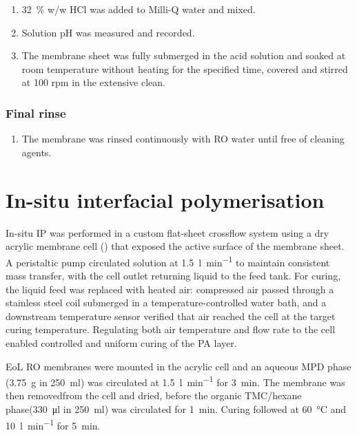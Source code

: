 \begin{enumerate}[resume]

\item \qty{32}{\percent} w/w HCl was added to Milli-Q water and mixed.

\item Solution pH was measured and recorded.

\item The membrane sheet was fully submerged in the acid solution and soaked at room temperature without heating for the specified time, covered and stirred at 100 rpm in the extensive clean.

\end{enumerate}

\subsubsection*{Final rinse}

\begin{enumerate}[resume]

\item The membrane was rinsed continuously with RO water until free of cleaning agents.

\end{enumerate}


\section{In-situ interfacial polymerisation}
\label{sec:ip-method}

In-situ IP was performed in a custom flat-sheet crossflow system using a dry acrylic membrane cell () that exposed the active surface of the membrane sheet. A peristaltic pump circulated solution at \qty{1.5}{\litre\per\minute} to maintain consistent mass transfer, with the cell outlet returning liquid to the feed tank. For curing, the liquid feed was replaced with heated air: compressed air passed through a stainless steel coil submerged in a temperature-controlled water bath, and a downstream temperature sensor verified that air reached the cell at the target curing temperature. Regulating both air temperature and flow rate to the cell enabled controlled and uniform curing of the PA layer.

EoL RO membranes were mounted in the acrylic cell and an aqueous MPD phase (\qty{3.75}{\gram} in \qty{250}{\milli\litre}) was circulated at \qty{1.5}{\litre\per\minute} for \qty{3}{\minute}. The membrane was then removedfrom the cell and dried, before the organic TMC/hexane phase(\qty{330}{\micro\litre} in \qty{250}{\milli\litre}) was circulated for \qty{1}{\minute}. Curing followed at \qty{60}{\degreeCelsius} and \qty{10}{\litre\per\minute} for \qty{5}{\minute}.

